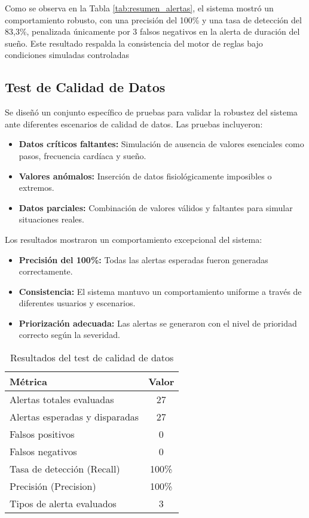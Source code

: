 Como se observa en la Tabla \ref{tab:resumen_alertas}, el sistema mostró un comportamiento robusto, con una precisión del 100\% y una tasa de detección del 83,3\%, penalizada únicamente por 3 falsos negativos en la alerta de duración del sueño. Este resultado respalda la consistencia del motor de reglas bajo condiciones simuladas controladas

\subsection{Test de Calidad de Datos}
\label{subsec:test_data_quality}

Se diseñó un conjunto específico de pruebas para validar la robustez del sistema ante diferentes escenarios de calidad de datos. Las pruebas incluyeron:

\begin{itemize}
    \item \textbf{Datos críticos faltantes:} Simulación de ausencia de valores esenciales como pasos, frecuencia cardíaca y sueño.
    \item \textbf{Valores anómalos:} Inserción de datos fisiológicamente imposibles o extremos.
    \item \textbf{Datos parciales:} Combinación de valores válidos y faltantes para simular situaciones reales.
\end{itemize}

Los resultados mostraron un comportamiento excepcional del sistema:

\begin{itemize}
    \item \textbf{Precisión del 100\%:} Todas las alertas esperadas fueron generadas correctamente.
    \item \textbf{Consistencia:} El sistema mantuvo un comportamiento uniforme a través de diferentes usuarios y escenarios.
    \item \textbf{Priorización adecuada:} Las alertas se generaron con el nivel de prioridad correcto según la severidad.
\end{itemize}

\begin{table}[H]
\centering
\caption{Resultados del test de calidad de datos}
\begin{tabular}{|l|c|}
\hline
\textbf{Métrica} & \textbf{Valor} \\ \hline
Alertas totales evaluadas & 27 \\
Alertas esperadas y disparadas & 27 \\
Falsos positivos & 0 \\
Falsos negativos & 0 \\
Tasa de detección (Recall) & 100\% \\
Precisión (Precision) & 100\% \\
Tipos de alerta evaluados & 3 \\ \hline
\end{tabular}
\label{tab:resumen_calidad_datos}
\end{table}

